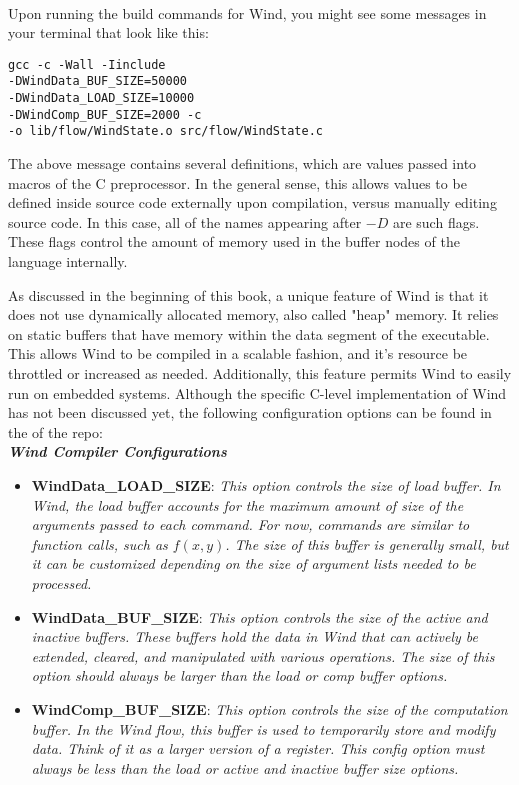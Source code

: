 \paragraph{  } Upon running the build commands for Wind, you might see some messages in your terminal that look like this:

\begin{verbatim}
gcc -c -Wall -Iinclude 
-DWindData_BUF_SIZE=50000 
-DWindData_LOAD_SIZE=10000 
-DWindComp_BUF_SIZE=2000 -c 
-o lib/flow/WindState.o src/flow/WindState.c
\end{verbatim}

\par The above message contains several definitions, which are values passed into macros of the C preprocessor. In the general sense, this allows values to be defined inside source code externally upon compilation, versus manually editing source code. In this case, all of the names appearing after $-D$ are such flags. These flags control the amount of memory used in the buffer nodes of the language internally.
\par As discussed in the beginning of this book, a unique feature of Wind is that it does not use dynamically allocated memory, also called "heap" memory. It relies on static buffers that have memory within the data segment of the executable. This allows Wind to be compiled in a scalable fashion, and it's resource be throttled or increased as needed. Additionally, this feature permits Wind to easily run on embedded systems. Although the specific C-level implementation of Wind has not been discussed yet, the following configuration options can be found in the  of the repo: \\

\textbf{\emph{Wind Compiler Configurations}}
\begin{itemize}
\item \textbf{WindData\_LOAD\_SIZE}: \emph{This option controls the size of load buffer. In Wind, the load buffer accounts for the maximum amount of size of the arguments passed to each command. For now, commands are similar to function calls, such as $f(x, y)$. The size of this buffer is generally small, but it can be customized depending on the size of argument lists needed to be processed.}
\item \textbf{WindData\_BUF\_SIZE}: \emph{This option controls the size of the active and inactive buffers. These buffers hold the data in Wind that can actively be extended, cleared, and manipulated with various operations. The size of this option should always be larger than the load or comp buffer options.}
\item \textbf{WindComp\_BUF\_SIZE}: \emph{This option controls the size of the computation buffer. In the Wind flow, this buffer is used to temporarily store and modify data. Think of it as a larger version of a register. This config option must always be less than the load or active and inactive buffer size options.}
\end{itemize}

